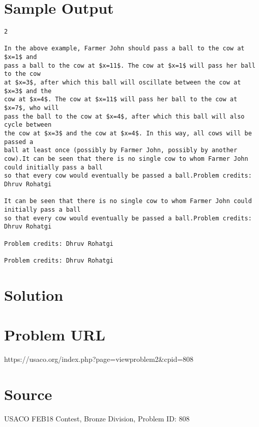 \documentclass[12pt]{article}
\begin{document}
\section*{Sample Output}
\begin{verbatim}
2

In the above example, Farmer John should pass a ball to the cow at $x=1$ and
pass a ball to the cow at $x=11$. The cow at $x=1$ will pass her ball to the cow
at $x=3$, after which this ball will oscillate between the cow at $x=3$ and the
cow at $x=4$. The cow at $x=11$ will pass her ball to the cow at $x=7$, who will
pass the ball to the cow at $x=4$, after which this ball will also cycle between
the cow at $x=3$ and the cow at $x=4$. In this way, all cows will be passed a
ball at least once (possibly by Farmer John, possibly by another cow).It can be seen that there is no single cow to whom Farmer John could initially pass a ball
so that every cow would eventually be passed a ball.Problem credits: Dhruv Rohatgi

It can be seen that there is no single cow to whom Farmer John could initially pass a ball
so that every cow would eventually be passed a ball.Problem credits: Dhruv Rohatgi

Problem credits: Dhruv Rohatgi

Problem credits: Dhruv Rohatgi
\end{verbatim}

\section*{Solution}


\section*{Problem URL}
https://usaco.org/index.php?page=viewproblem2&cpid=808

\section*{Source}
USACO FEB18 Contest, Bronze Division, Problem ID: 808
\end{document}
